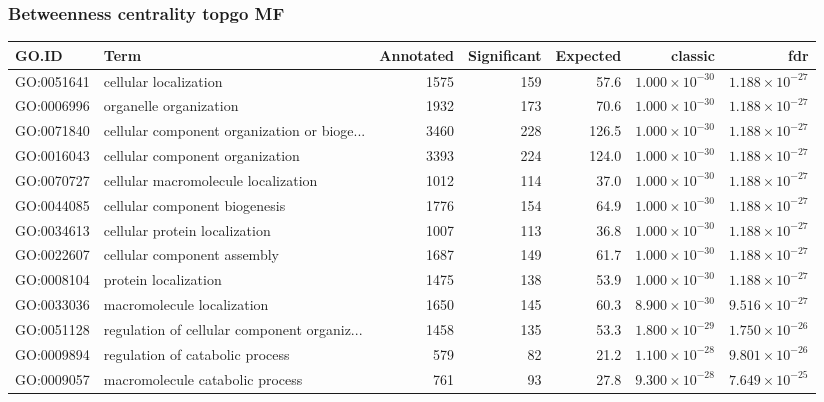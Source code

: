 \subsubsection{Betweenness centrality topgo MF}
\begin{table}[ht]
\centering
\begin{adjustbox}{width=\textwidth}

\begin{tabular}{llrrrrr}
  \hline
GO.ID & Term & Annotated & Significant & Expected & classic & fdr \\ 
  \hline
GO:0051641 & cellular localization & 1575 & 159 & 57.6 & $1.000 \times 10^{-30}$ & $1.188 \times 10^{-27}$ \\ 
  GO:0006996 & organelle organization & 1932 & 173 & 70.6 & $1.000 \times 10^{-30}$ & $1.188 \times 10^{-27}$ \\ 
  GO:0071840 & cellular component organization or bioge... & 3460 & 228 & 126.5 & $1.000 \times 10^{-30}$ & $1.188 \times 10^{-27}$ \\ 
  GO:0016043 & cellular component organization & 3393 & 224 & 124.0 & $1.000 \times 10^{-30}$ & $1.188 \times 10^{-27}$ \\ 
  GO:0070727 & cellular macromolecule localization & 1012 & 114 & 37.0 & $1.000 \times 10^{-30}$ & $1.188 \times 10^{-27}$ \\ 
  GO:0044085 & cellular component biogenesis & 1776 & 154 & 64.9 & $1.000 \times 10^{-30}$ & $1.188 \times 10^{-27}$ \\ 
  GO:0034613 & cellular protein localization & 1007 & 113 & 36.8 & $1.000 \times 10^{-30}$ & $1.188 \times 10^{-27}$ \\ 
  GO:0022607 & cellular component assembly & 1687 & 149 & 61.7 & $1.000 \times 10^{-30}$ & $1.188 \times 10^{-27}$ \\ 
  GO:0008104 & protein localization & 1475 & 138 & 53.9 & $1.000 \times 10^{-30}$ & $1.188 \times 10^{-27}$ \\ 
  GO:0033036 & macromolecule localization & 1650 & 145 & 60.3 & $8.900 \times 10^{-30}$ & $9.516 \times 10^{-27}$ \\ 
  GO:0051128 & regulation of cellular component organiz... & 1458 & 135 & 53.3 & $1.800 \times 10^{-29}$ & $1.750 \times 10^{-26}$ \\ 
  GO:0009894 & regulation of catabolic process & 579 & 82 & 21.2 & $1.100 \times 10^{-28}$ & $9.801 \times 10^{-26}$ \\ 
  GO:0009057 & macromolecule catabolic process & 761 & 93 & 27.8 & $9.300 \times 10^{-28}$ & $7.649 \times 10^{-25}$ \\ 

\end{tabular}
\end{adjustbox}
\end{table}
